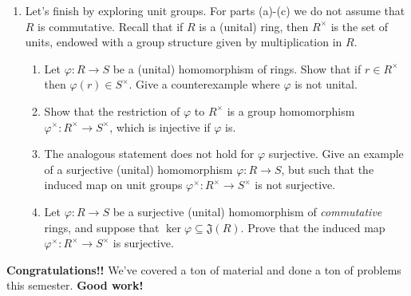 \documentclass[11pt]{article}
\newcommand{\fJ}{\mathfrak{J}}
\begin{document}
\begin{enumerate}
{\begin{enumerate}
  \end{enumerate}
  }
    \item{
  Let's finish by exploring unit groups. For parts (a)-(c) we do not assume that $R$ is commutative.  Recall that if $R$ is a (unital) ring, then $R^\times$ is the set of units, endowed with a group structure given by multiplication in $R$.
  \begin{enumerate}
    \item{
    Let $\varphi:R\to S$ be a (unital) homomorphism of rings.  Show that if $r\in R^\times$ then $\varphi(r)\in S^\times$.  Give a counterexample where $\varphi$ is not unital.
    }
    \item{
    Show that the restriction of $\varphi$ to $R^\times$ is a group homomorphism $\varphi^\times: R^\times\to S^\times$, which is injective if $\varphi$ is.
    }
    \item{
    The analogous statement does not hold for $\varphi$ surjective.  Give an example of a surjective (unital) homomorphism $\varphi:R\to S$, but such that the induced map on unit groups $\varphi^\times:R^\times\to S^\times$ is not surjective.
    }
    \item{
    Let $\varphi:R\to S$ be a surjective (unital) homomorphism of \textit{commutative} rings, and suppose that $\ker\varphi\subseteq\fJ(R)$.  Prove that the induced map $\varphi^\times:R^\times\to S^\times$ is surjective.
    }
  \end{enumerate}
}
\end{enumerate}
\textbf{Congratulations!!}  We've covered a ton of material and done a ton of problems this semester.  \textbf{Good work!}
\end{document}
